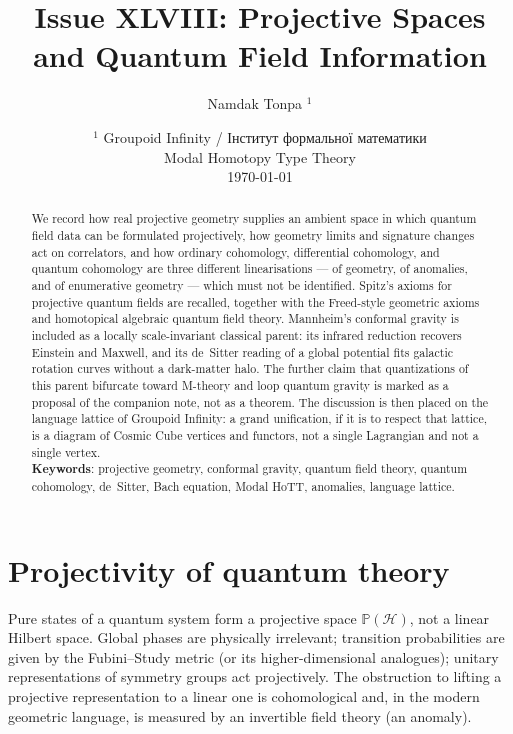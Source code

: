 \documentclass{article}
\theoremstyle{definition}
\newcommand{\Hilb}{\mathcal{H}}
\newif\ifincludeTOC
\begin{document}
\title{Issue XLVIII: Projective Spaces and Quantum Field Information}
\author{Namdak Tonpa $^1$}
\date{$^1$ Groupoid Infinity / \foreignlanguage{ukrainian}{Інститут формальної математики} \\
       \small Modal Homotopy Type Theory \\
       \today}
\maketitle

\begin{abstract}
We record how real projective geometry supplies an ambient space in which
quantum field data can be formulated projectively, how geometry limits and
signature changes act on correlators, and how ordinary cohomology,
differential cohomology, and quantum cohomology are three different
linearisations --- of geometry, of anomalies, and of enumerative geometry ---
which must not be identified.  Spitz's axioms for projective quantum fields
are recalled, together with the Freed-style geometric axioms and homotopical
algebraic quantum field theory.  Mannheim's conformal gravity is included as
a locally scale-invariant classical parent: its infrared reduction recovers
Einstein and Maxwell, and its de~Sitter reading of a global potential fits
galactic rotation curves without a dark-matter halo.  The further claim that
quantizations of this parent bifurcate toward M-theory and loop quantum
gravity is marked as a proposal of the companion note, not as a theorem.
The discussion is then placed on the language lattice of Groupoid Infinity:
a grand unification, if it is to respect that lattice, is a diagram of
Cosmic Cube vertices and functors, not a single Lagrangian and not a single
vertex.
\\[0.5em]
{\bf Keywords}: projective geometry, conformal gravity, quantum field theory,
quantum cohomology, de~Sitter, Bach equation, Modal HoTT, anomalies,
language lattice.
\end{abstract}

\ifincludeTOC
  \tableofcontents
\fi

\section{Projectivity of quantum theory}

Pure states of a quantum system form a projective space \(\mathbb{P}(\Hilb)\),
not a linear Hilbert space.  Global phases are physically irrelevant;
transition probabilities are given by the Fubini--Study metric (or its
higher-dimensional analogues); unitary representations of symmetry groups
act projectively.  The obstruction to lifting a projective representation
to a linear one is cohomological and, in the modern geometric language,
is measured by an invertible field theory (an anomaly).
\end{document}

